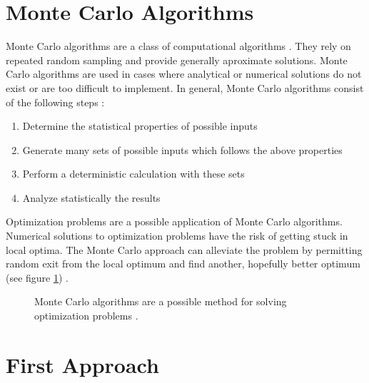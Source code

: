 \documentclass[10pt,twocolumn,letterpaper]{article}
\begin{document}
\section{Monte Carlo Algorithms} \label{sec:MC}

Monte Carlo algorithms are a class of computational algorithms \cite{MC}. They rely on repeated random sampling and provide generally aproximate solutions. Monte Carlo algorithms are used in cases where analytical or numerical solutions do not exist or are too difficult to implement.
In general, Monte Carlo algorithms consist of the following steps \cite{MC}:

\begin{enumerate}
\item Determine the statistical properties of possible inputs
\item Generate many sets of possible inputs which follows
the above properties
\item Perform a deterministic calculation with these sets
\item Analyze statistically the results
\end{enumerate}

Optimization problems are a possible application of Monte Carlo algorithms. Numerical solutions to optimization problems have the risk of getting stuck in local optima. The Monte Carlo approach can alleviate the problem by permitting random exit from the local optimum and find another, hopefully better optimum (see figure \ref{fig:MC}) \cite{MC}.

\begin{figure}
	\hspace{1mm}
	\caption{Monte Carlo algorithms are a possible method for solving optimization problems \cite{MC}.}
	\label{fig:MC}
\end{figure}

\section{First Approach} \label{sec:firstApproach}
\end{document}
